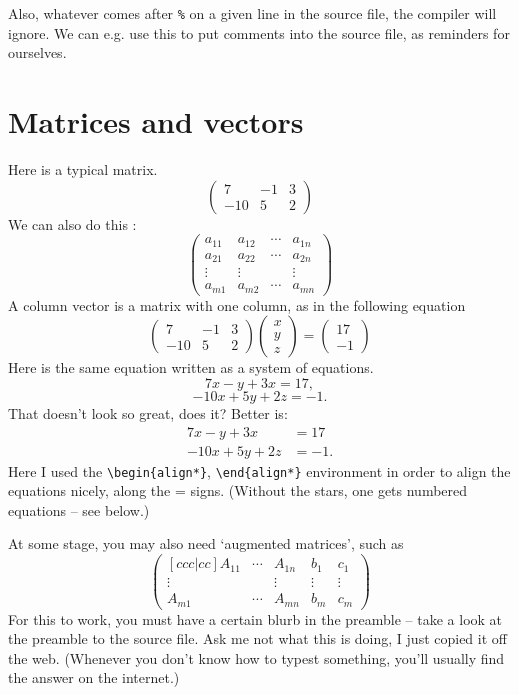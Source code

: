 \documentclass[11pt]{amsart}
\begin{document}
Also, whatever comes after \verb!%! on a given line in the source file, the compiler will ignore. We can e.g. use this to put comments into the source file,  as reminders for ourselves.  
 

\section{Matrices and vectors}
Here is a typical matrix. 
$$ \left( 
\begin{array}{ccc}   %
7 & -1 & 3 \\ -10 & 5 & 2
\end{array}\right)
$$
We can also do this :
$$ \left( 
\begin{array}{cccc}   %
a_{11} & a_{12} & \cdots & a_{1n} \\ 
a_{21} & a_{22} & \cdots & a_{2n} \\
\vdots & \vdots  &            & \vdots \\
a_{m1} & a_{m2} & \cdots & a_{mn}
\end{array}\right)
$$
%
A column vector is a matrix with one column, as in the following equation
%
$$\left( 
\begin{array}{ccc}   
7 & -1 & 3 \\ -10 & 5 & 2
\end{array}\right)
 \left( 
\begin{array}{c}   
x \\ y \\ z 
\end{array}\right)
=
 \left( 
\begin{array}{c}   
17 \\ -1 
\end{array}
\right)
$$
Here is the same equation written as a system of equations. 
$$ 7 x -y +3 x    = 17,$$
$$ -10 x +5y+2z  = -1.$$
That doesn't look so great, does it? Better is: 
\begin{align*}
7 x -y +3 x   & = 17\\
-10 x +5y+2z & = -1.
\end{align*}
Here I used the \verb!\begin{align*}!, 
\verb!\end{align*}! environment in order to align the equations nicely, along 
the = signs. (Without the stars, one gets numbered equations -- see below.) 

At some stage, you may also need `augmented matrices', such as 
\[
\begin{pmatrix}[ccc|cc]
A_{11}& \cdots & A_{1n}& b_1&  c_1 \\ 
\vdots & & \vdots   & \!\!\vdots &  \vdots \\ 
A_{m1}& \cdots & A_{mn}& b_m &  c_m
 \end{pmatrix}
\]
For this to work, you must have a certain blurb in the preamble -- take a look at the preamble to the source file. 
Ask me not what this is doing, I just copied it off the web. (Whenever you don't know how to typest something, you'll usually find the answer on the internet.)
\end{document}
